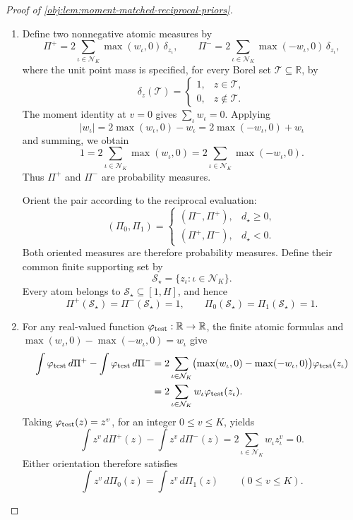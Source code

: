\documentclass[11pt]{article}
\begin{document}
\begin{proof}[Proof of \cref{obj:lem:moment-matched-reciprocal-priors}]
\begin{enumerate}
\item Define two nonnegative atomic measures by
\[
\Pi^+
=2\sum_{\iota\in\mathcal N_K}\max(w_\iota,0)\,\delta_{z_\iota},
\qquad
\Pi^-
=2\sum_{\iota\in\mathcal N_K}\max(-w_\iota,0)\,\delta_{z_\iota},
\]
where the unit point mass is specified, for every Borel set \(\mathcal T\subseteq\mathbb R\), by
\[
\delta_z(\mathcal T)
=
\begin{cases}
1,&z\in\mathcal T,\\
0,&z\notin\mathcal T.
\end{cases}
\]
The moment identity at \(v=0\) gives \(\sum_\iota w_\iota=0\). Applying
\[
|w_\iota|=2\max(w_\iota,0)-w_\iota
         =2\max(-w_\iota,0)+w_\iota
\]
and summing, we obtain
\[
1=2\sum_{\iota\in\mathcal N_K}\max(w_\iota,0)
 =2\sum_{\iota\in\mathcal N_K}\max(-w_\iota,0).
\]
Thus \(\Pi^+\) and \(\Pi^-\) are probability measures.

Orient the pair according to the reciprocal evaluation:
\[
(\Pi_0,\Pi_1)
=
\begin{cases}
(\Pi^-,\Pi^+),&d_\star\ge0,\\
(\Pi^+,\Pi^-),&d_\star<0.
\end{cases}
\]
Both oriented measures are therefore probability measures. Define their common finite supporting set by
\[
\mathcal S_\star=\{z_\iota:\iota\in\mathcal N_K\}.
\]
Every atom belongs to \(\mathcal S_\star\subseteq[1,H]\), and hence
\[
\Pi^+(\mathcal S_\star)=\Pi^-(\mathcal S_\star)=1,
\qquad
\Pi_0(\mathcal S_\star)=\Pi_1(\mathcal S_\star)=1.
\]

\item For any real-valued function \(\varphi_{\rm test}:\mathbb R\to\mathbb R\), the finite atomic formulas and
\(\max(w_\iota,0)-\max(-w_\iota,0)=w_\iota\) give
\[
\begin{aligned}
\int\varphi_{\rm test}\,d\Pi^+
-\int\varphi_{\rm test}\,d\Pi^-
&=2\sum_{\iota\in\mathcal N_K}
 \bigl(\max(w_\iota,0)-\max(-w_\iota,0)\bigr)
 \varphi_{\rm test}(z_\iota)\\
&=2\sum_{\iota\in\mathcal N_K}
 w_\iota\varphi_{\rm test}(z_\iota).
\end{aligned}
\]
Taking \(\varphi_{\rm test}(z)=z^v\), for an integer \(0\le v\le K\), yields
\[
\int z^v\,d\Pi^+(z)-\int z^v\,d\Pi^-(z)
=2\sum_{\iota\in\mathcal N_K}w_\iota z_\iota^v=0.
\]
Either orientation therefore satisfies
\[
\int z^v\,d\Pi_0(z)=\int z^v\,d\Pi_1(z)
\qquad(0\le v\le K).
\]


\end{enumerate}
\end{proof}
\end{document}
